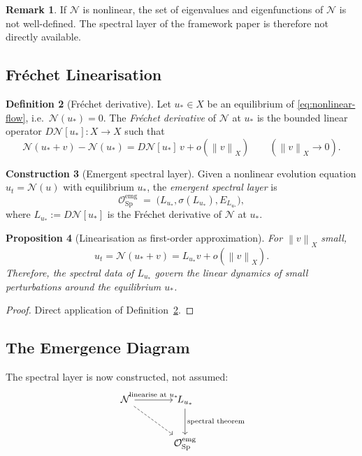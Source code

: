 \documentclass[11pt,a4paper]{article}
\theoremstyle{definition}
\newtheorem{definition}{Definition}[section]
\newtheorem{remark}[definition]{Remark}
\newtheorem{construction}[definition]{Construction}
\theoremstyle{plain}
\newtheorem{proposition}[definition]{Proposition}
\newcommand{\Sp}{\mathrm{Sp}}
\newcommand{\Ocal}{\mathcal{O}}
\newcommand{\Ncal}{\mathcal{N}}
\newcommand{\spec}{\sigma}
\newcommand{\Norm}[1]{\left\lVert #1 \right\rVert}
\begin{document}
\begin{remark}
If $\Ncal$ is nonlinear, the set of eigenvalues and eigenfunctions
of $\Ncal$ is not well-defined. The spectral layer of the framework
paper is therefore not directly available.
\end{remark}

\subsection{Fr\'echet Linearisation}

\begin{definition}[Fr\'echet derivative]\label{def:frechet}
Let $u_\ast \in X$ be an equilibrium of \eqref{eq:nonlinear-flow},
i.e.\ $\Ncal(u_\ast) = 0$. The \emph{Fr\'echet derivative} of
$\Ncal$ at $u_\ast$ is the bounded linear operator
$D\Ncal[u_\ast] : X \to X$ such that
\[
  \Ncal(u_\ast + v) - \Ncal(u_\ast)
  =
  D\Ncal[u_\ast]\, v + o(\Norm{v}_X)
  \qquad (\Norm{v}_X \to 0).
\]
\end{definition}

\begin{construction}[Emergent spectral layer]\label{constr:emergent-spectral}
Given a nonlinear evolution equation $u_t = \Ncal(u)$ with
equilibrium $u_\ast$, the \emph{emergent spectral layer} is
\[
  \Ocal_\Sp^{\mathrm{emg}}
  \;=\;
  \bigl(
    L_{u_\ast},
    \spec(L_{u_\ast}),
    E_{L_{u_\ast}}
  \bigr),
\]
where $L_{u_\ast} := D\Ncal[u_\ast]$ is the Fr\'echet derivative of
$\Ncal$ at $u_\ast$.
\end{construction}

\begin{proposition}[Linearisation as first-order approximation]\label{prop:linearisation}
For $\Norm{v}_X$ small,
\[
  u_t = \Ncal(u_\ast + v)
  =
  L_{u_\ast} v + o(\Norm{v}_X).
\]
Therefore, the spectral data of $L_{u_\ast}$ govern the linear
dynamics of small perturbations around the equilibrium $u_\ast$.
\end{proposition}

\begin{proof}
Direct application of Definition~\ref{def:frechet}.
\end{proof}

\subsection{The Emergence Diagram}

The spectral layer is now constructed, not assumed:
\begin{equation}\label{eq:emergence-diagram}
\begin{tikzcd}[row sep=large, column sep=large]
  \Ncal \arrow[r, "\text{linearise at } u_\ast"] \arrow[dr, dashed]
    & L_{u_\ast} \arrow[d, "\text{spectral theorem}"] \\
  & \Ocal_\Sp^{\mathrm{emg}}
\end{tikzcd}
\end{equation}
\end{document}
